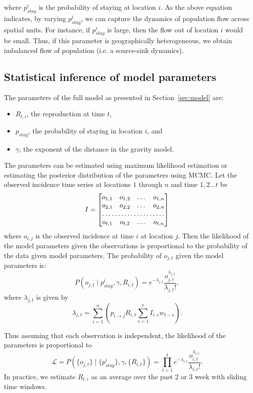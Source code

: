 \documentclass[11pt,]{article}
\begin{document}
where \(p_{stay}^i\) is the probability of staying at location
\(i\). As the above equation indicates, by varying $p_{stay}^i$, we
can capture the dynamics of population flow across spatial units. For
instance, if \(p_{stay}^i\) is large, then the flow out of location
\(i\) would be small. Thus, if this parameter is geographically
heterogeneous, we obtain imbalanced flow of population (i.e. a source-sink dynamics). 

\subsection{Statistical inference of model parameters}

The parameters of the full model as presented in Section~\ref{sec:model} are: 
\begin{itemize}
\item $R_{t, i}$, the reproduction at time $t$,
\item $p_{stay}$, the probability of staying in location $i$, and 
\item $\gamma$, the exponent of the distance in the gravity model. 
\end{itemize}


The parameters can be estimated using maximum likelihood
estimation or estimating the posterior distribution of the parameters using
MCMC. Let the observed incidence time series at locations \(1\)
through \(n\) and time \(1, 2 \dots t\) be
\[
I = \begin{bmatrix}
    o_{1,1}       & o_{1,2}  & \dots & o_{1,n} \\
    o_{2,1}       & o_{2,2}  & \dots & o_{2,n} \\
    \hdotsfor{4} \\
    o_{t,1}       & o_{t,2}  & \dots & o_{t,n}
\end{bmatrix}
\]
where \(o_{i, j}\) is the observed incidence at time \(i\) at location
\(j\).
Then the likelihood of the model parameters given the
observations is proportional to the probability of the data given
model parameters.  The probability of $o_{j, t}$ given
the model parameters is:
\[ P(o_{j, t} \mid p_{stay}^i, \gamma, R_{i, t}) = e^{-\lambda_{j, t}}
  \frac{o_{j, t}^{\lambda_{j, t}}}{\lambda_{j, t} !}, \]
where $\lambda_{j, t}$ is given by
\[
  \lambda_{j, t} = \sum_{i = 1}^n{\left(p_{i \rightarrow j}R_{i, t} \sum_{s
        = 1}^t{I_{i, s}w_{t - s}} \right)}.\]

Thus assuming that each observation is independent, the likelihood of the parameters is proportional to
\[
\mathcal{L} = P(\{o_{j, t}\} \mid \{p_{stay}^i\}, \gamma, \{R_{i, t}\}) = 
 \prod_{t = 1}^{t}{e^{-\lambda_{i, t}} \frac{o_{i, t}^{\lambda_{i, t}}}{\lambda_{i, t} !}}.
\]
In practice, we estimate $R_{t, i}$ as an average over the past 2 or 3 week with sliding time windows.
\end{document}
